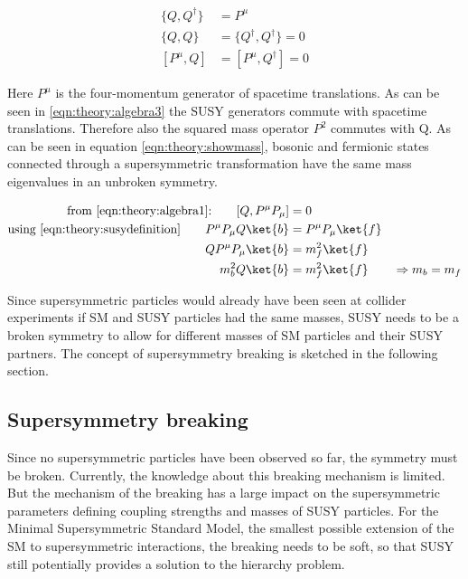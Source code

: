 \begin{align}
\{Q, Q^\dagger\} &= P^\mu \label{eqn:theory:algebra1}\\
\{Q,Q\} &= \{Q^\dagger, Q^\dagger\} \label{eqn:theory:algebra2} =0\\
[P^\mu,Q] &= [P^\mu, Q^\dagger] = 0 \label{eqn:theory:algebra3}
\end{align}

Here $P^\mu$ is the four-momentum generator of spacetime translations. As can be seen in \ref{eqn:theory:algebra3} the SUSY generators commute with spacetime translations. Therefore also the squared mass operator $P^2$ commutes with Q. As can be seen in equation \ref{eqn:theory:showmass}, bosonic and fermionic states connected through a supersymmetric transformation have the same mass eigenvalues in an unbroken symmetry.

\begin{align}
\begin{split}
\text{from \eqref{eqn:theory:algebra1}:} \qquad [Q, P^{\mu} P_{  \mu}] &= 0 \\
\text{using \eqref{eqn:theory:susydefinition}} \qquad  P^{\mu} P_{  \mu} Q  \ket{b} &=  P^{\mu} P_{  \mu} \ket{f}\\
Q  P^{\mu} P_{  \mu} \ket{b} & = m_f^2 \ket{f}\\
m_b^2 Q \ket{b} &= m_f^2 \ket{f} \qquad \Rightarrow m_b = m_f
\end{split} \label{eqn:theory:showmass}
\end{align}

Since supersymmetric particles would already have been seen at collider experiments if SM and SUSY particles had the same masses, SUSY needs to be a broken symmetry to allow for different masses of SM particles and their SUSY partners. The concept of supersymmetry breaking is sketched in the following section.


\subsection{Supersymmetry breaking}
Since no supersymmetric particles have been observed so far, the symmetry must be broken. Currently, the knowledge about this breaking mechanism is limited. But the mechanism of the breaking has a large impact on the supersymmetric parameters defining coupling strengths and masses of SUSY particles. For the Minimal Supersymmetric Standard Model, the smallest possible extension of the SM to supersymmetric interactions, the breaking needs to be soft, so that SUSY still potentially provides a solution to the hierarchy problem.

